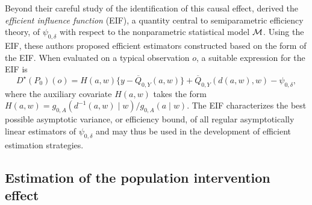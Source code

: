 Beyond their careful study of the identification of this causal effect,
\citet{diaz2012population, diaz2018stochastic} derived the \textit{efficient
influence function} (EIF), a quantity central to semiparametric efficiency
theory, of $\psi_{0, \delta}$ with respect to the nonparametric statistical
model $\mathcal{M}$. Using the EIF, these authors proposed efficient estimators
constructed based on the form of the EIF. When evaluated on a typical
observation $o$, a suitable expression for the EIF is
\begin{equation}\label{eqn:eif_full}
  D^{\star}(P_0)(o) = H(a, w)\{y - \overline{Q}_{0,Y}(a, w)\} +
  \overline{Q}_{0,Y}(d(a, w), w) - \psi_{0,\delta},
\end{equation}
where the auxiliary covariate $H(a,w)$ takes the form $H(a, w) = g_{0,
A}(d^{-1}(a, w) \mid w) / g_{0, A}(a \mid w)$. The EIF characterizes the best
possible asymptotic variance, or efficiency bound, of all regular asymptotically
linear estimators of $\psi_{0, \delta}$ and may thus be used in the development
of efficient estimation strategies.

\subsection{Estimation of the population intervention effect}\label{pie_est}

